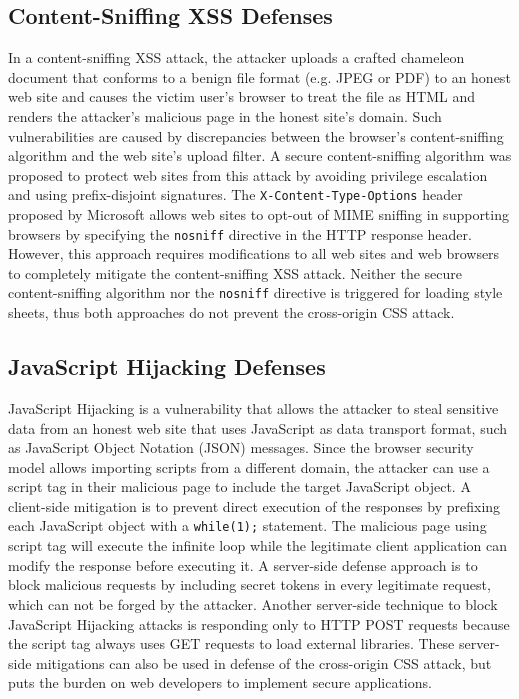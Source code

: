 \documentclass{acm_proc_article-sp}
\begin{document}
{\subsection{Content-Sniffing XSS Defenses}
In a content-sniffing XSS attack, the attacker uploads a crafted chameleon document that conforms to a benign file format (e.g. JPEG or PDF) to an honest web site and causes the victim user's browser to treat the file as HTML and renders the attacker's malicious page in the honest site's domain. Such vulnerabilities are caused by discrepancies between the browser's content-sniffing algorithm and the web site's upload filter. A secure content-sniffing algorithm\cite{securecontentsniffing} was proposed to protect web sites from this attack by avoiding privilege escalation and using prefix-disjoint signatures. The \texttt{X-Content-Type-Options} header \cite{nosniff} proposed by Microsoft allows web sites to opt-out of MIME sniffing in supporting browsers by specifying the \texttt{nosniff} directive in the HTTP response header. However, this approach requires modifications to all web sites and web browsers to completely mitigate the content-sniffing XSS attack. Neither the secure content-sniffing algorithm nor the \texttt{nosniff} directive is triggered for loading style sheets, thus both approaches do not prevent the cross-origin CSS attack.

\subsection{JavaScript Hijacking Defenses}
JavaScript Hijacking\cite{jshijacking} is a vulnerability that allows the attacker to steal sensitive data from an honest web site that uses JavaScript as data transport format, such as JavaScript Object Notation (JSON) messages. Since the browser security model allows importing scripts from a different domain, the attacker can use a script tag in their malicious page to include the target JavaScript object. A client-side mitigation is to prevent direct execution of the responses by prefixing each JavaScript object with a \texttt{while(1);} statement. The malicious page using script tag will execute the infinite loop while the legitimate client application can modify the response before executing it. A server-side defense approach is to block malicious requests by including secret tokens in every legitimate request, which can not be forged by the attacker. Another server-side technique to block JavaScript Hijacking attacks is responding only to HTTP POST requests because the script tag always uses GET requests to load external libraries. These server-side mitigations can also be used in defense of the cross-origin CSS attack, but puts the burden on web developers to implement secure applications.

}
\end{document}
